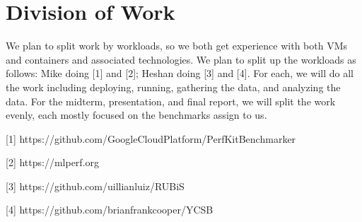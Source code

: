 \documentclass[11pt]{article}
\begin{document}
\section{Division of Work}

We plan to split work by workloads, so we both get experience with both VMs and containers and associated technologies. We plan to split up the workloads as follows: Mike doing [1] and [2]; Heshan doing [3] and [4]. For each, we will do all the work including deploying, running, gathering the data, and analyzing the data. For the midterm, presentation, and final report, we will split the work evenly, each mostly focused on the benchmarks assign to us.

\hspace{16pt}

[1] https://github.com/GoogleCloudPlatform/PerfKitBenchmarker

[2] https://mlperf.org

[3] https://github.com/uillianluiz/RUBiS

[4] https://github.com/brianfrankcooper/YCSB
\end{document}
